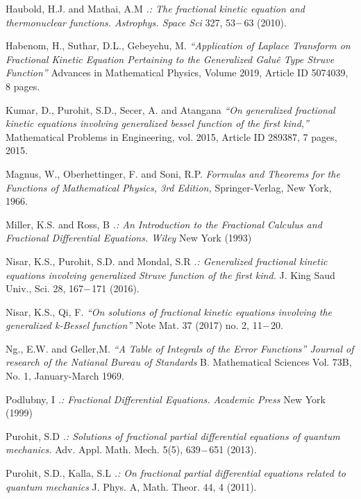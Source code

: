 \documentclass{article}
\begin{document}
\begin{thebibliography}{9}
    Haubold, H.J. and Mathai, A.M
    \textit{.: The fractional kinetic equation and thermonuclear functions. Astrophys. Space Sci}
    327, 53$\--$63 (2010).

    Habenom, H., Suthar, D.L., Gebeyehu, M.
    \textit{“Application of Laplace Transform on Fractional Kinetic Equation Pertaining to the Generalized Galu\^e Type Struve Function”}
    Advances in Mathematical Physics, Volume 2019, Article ID 5074039, 8 pages.

    Kumar, D., Purohit, S.D., Secer, A. and Atangana
    \textit{“On generalized fractional kinetic equations involving generalized bessel function of the first kind,”}
    Mathematical Problems in Engineering, vol. 2015, Article ID 289387, 7 pages, 2015.

    Magnus, W., Oberhettinger, F. and Soni, R.P.
    \textit{Formulas and Theorems for the Functions of Mathematical Physics, 3rd Edition,}
    Springer-Verlag, New York, 1966.

    Miller, K.S. and Ross, B
    \textit{.: An Introduction to the Fractional Calculus and Fractional Differential Equations. Wiley}
    New York (1993)

    Nisar, K.S., Purohit, S.D. and Mondal, S.R
    \textit{.: Generalized fractional kinetic equations involving generalized Struve function of the first kind.}
    J. King Saud Univ., Sci. 28, 167$\--$171 (2016).

    Nisar, K.S., Qi, F.
    \textit{“On solutions of fractional kinetic equations involving the generalized k-Bessel function”}
    Note Mat. 37 (2017) no. 2, 11$\--$20.

    Ng., E.W.  and Geller,M.
    \textit{“A Table of Integrals of the Error Functions” Journal  of research of the Natianal Bureau of Standards}
    B. Mathematical Sciences Vol. 73B, No. 1, January-March 1969.

    Podlubny, I
    \textit{.: Fractional Differential Equations. Academic Press}
    New York (1999)

    Purohit, S.D
    \textit{.: Solutions of fractional partial differential equations of quantum mechanics.}
    Adv. Appl. Math. Mech. 5(5), 639$\--$651 (2013).

    Purohit, S.D., Kalla, S.L
    \textit{.: On fractional partial differential equations related to quantum mechanics}
    J. Phys. A, Math. Theor. 44, 4 (2011).


\end{thebibliography}
\end{document}

